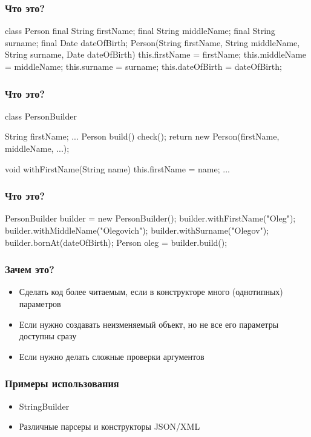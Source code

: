 \documentclass[russian,aspectratio=169,14pt]{beamer}
\begin{document}
\begin{frame}[fragile]
	\frametitle{Что это?}
\begin{listjava}
class Person {
	final String firstName;
	final String middleName;
	final String surname;
	final Date dateOfBirth;
	Person(String firstName, String middleName, 
	       String surname, Date dateOfBirth) {
		this.firstName = firstName;
		this.middleName = middleName;
		this.surname = surname;
		this.dateOfBirth = dateOfBirth;
	}
}
\end{listjava}	
\end{frame}

\begin{frame}[fragile]
	\frametitle{Что это?}
\begin{listjava}
class PersonBuilder {
    String firstName;
    ...
    Person build() {
        check();
        return new Person(firstName, middleName, ...);
    }
    
    void withFirstName(String name) {
        this.firstName = name;
    }
    ...
}
\end{listjava}	
\end{frame}

\begin{frame}[fragile]
	\frametitle{Что это?}
\begin{listjava}
PersonBuilder builder = new PersonBuilder();
builder.withFirstName("Oleg");
builder.withMiddleName("Olegovich");
builder.withSurname("Olegov");
builder.bornAt(dateOfBirth);
Person oleg = builder.build();
\end{listjava}	
\end{frame}

\begin{frame}
	\frametitle{Зачем это?}
	\begin{itemize}
		\item Сделать код более читаемым, если в конструкторе много (однотипных) параметров
		\pause
		\item Если нужно создавать неизменяемый объект, но не все его параметры доступны сразу
		\pause
		\item Если нужно делать сложные проверки аргументов
	\end{itemize}
\end{frame}

\begin{frame}
	\frametitle{Примеры использования}
	\begin{itemize}
		\item StringBuilder
		\item Различные парсеры и конструкторы JSON/XML
	\end{itemize}
\end{frame}
\end{document}
